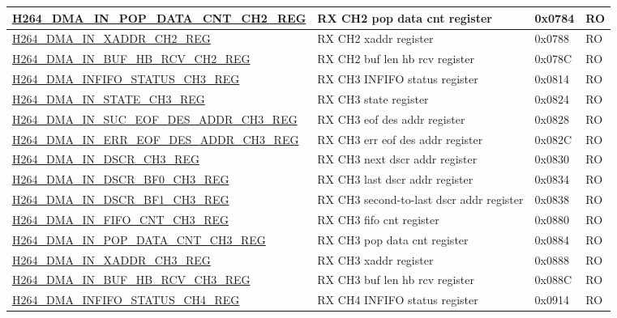 \begin{longtable}{ | p{7.5cm} | p{5.7cm} | p{1.2cm} | p{1.5cm} | }
\hyperref[regdesc:H264DMAINPOPDATACNTCH2REG]{H264\_DMA\_IN\_POP\_DATA\_CNT\_CH2\_REG} & RX CH2 pop data cnt register & 0x0784 & RO \\ \hline
\hyperref[regdesc:H264DMAINXADDRCH2REG]{H264\_DMA\_IN\_XADDR\_CH2\_REG} & RX CH2 xaddr register & 0x0788 & RO \\ \hline
\hyperref[regdesc:H264DMAINBUFHBRCVCH2REG]{H264\_DMA\_IN\_BUF\_HB\_RCV\_CH2\_REG} & RX CH2 buf len hb rcv register & 0x078C & RO \\ \hline
\hyperref[regdesc:H264DMAINFIFOSTATUSCH3REG]{H264\_DMA\_INFIFO\_STATUS\_CH3\_REG} & RX CH3 INFIFO status register & 0x0814 & RO \\ \hline
\hyperref[regdesc:H264DMAINSTATECH3REG]{H264\_DMA\_IN\_STATE\_CH3\_REG} & RX CH3 state register & 0x0824 & RO \\ \hline
\hyperref[regdesc:H264DMAINSUCEOFDESADDRCH3REG]{H264\_DMA\_IN\_SUC\_EOF\_DES\_ADDR\_CH3\_REG} & RX CH3 eof des addr register & 0x0828 & RO \\ \hline
\hyperref[regdesc:H264DMAINERREOFDESADDRCH3REG]{H264\_DMA\_IN\_ERR\_EOF\_DES\_ADDR\_CH3\_REG} & RX CH3 err eof des addr register & 0x082C & RO \\ \hline
\hyperref[regdesc:H264DMAINDSCRCH3REG]{H264\_DMA\_IN\_DSCR\_CH3\_REG} & RX CH3 next dscr addr register & 0x0830 & RO \\ \hline
\hyperref[regdesc:H264DMAINDSCRBF0CH3REG]{H264\_DMA\_IN\_DSCR\_BF0\_CH3\_REG} & RX CH3 last dscr addr register & 0x0834 & RO \\ \hline
\hyperref[regdesc:H264DMAINDSCRBF1CH3REG]{H264\_DMA\_IN\_DSCR\_BF1\_CH3\_REG} & RX CH3 second-to-last dscr addr register & 0x0838 & RO \\ \hline
\hyperref[regdesc:H264DMAINFIFOCNTCH3REG]{H264\_DMA\_IN\_FIFO\_CNT\_CH3\_REG} & RX CH3 fifo cnt register & 0x0880 & RO \\ \hline
\hyperref[regdesc:H264DMAINPOPDATACNTCH3REG]{H264\_DMA\_IN\_POP\_DATA\_CNT\_CH3\_REG} & RX CH3 pop data cnt register & 0x0884 & RO \\ \hline
\hyperref[regdesc:H264DMAINXADDRCH3REG]{H264\_DMA\_IN\_XADDR\_CH3\_REG} & RX CH3 xaddr register & 0x0888 & RO \\ \hline
\hyperref[regdesc:H264DMAINBUFHBRCVCH3REG]{H264\_DMA\_IN\_BUF\_HB\_RCV\_CH3\_REG} & RX CH3 buf len hb rcv register & 0x088C & RO \\ \hline
\hyperref[regdesc:H264DMAINFIFOSTATUSCH4REG]{H264\_DMA\_INFIFO\_STATUS\_CH4\_REG} & RX CH4 INFIFO status register & 0x0914 & RO \\ \hline

\end{longtable}
